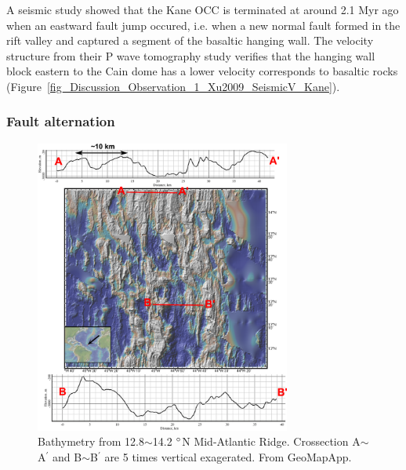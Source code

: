 A seismic study \citep{Xu2009} showed that the Kane OCC is terminated at around 2.1 Myr ago when an eastward fault jump occured, i.e. when a new normal fault formed in the rift valley and captured a segment of the basaltic hanging wall. The velocity structure from their P wave tomography study verifies that the hanging wall block eastern to the Cain dome has a lower velocity corresponds to basaltic rocks (Figure~\hyperref[fig_Discussion_Observation_1_Xu2009_SeismicV_Kane]{\ref{fig_Discussion_Observation_1_Xu2009_SeismicV_Kane}}).

\subsubsection{Fault alternation}

\begin{figure}[h]
 \centering
  \includegraphics[width=0.75\textwidth]{./Figures/fig_Discussion_Observation_2_13-14N_MAR.eps}
 \caption[Bathymetry from 12.8$\sim$14.2 $\degree$N Mid-Atlantic Ridge.]{Bathymetry from 12.8$\sim$14.2 $\degree$N Mid-Atlantic Ridge. Crossection A$\sim$A$^{\prime}$ and B$\sim$B$^{\prime}$ are 5 times vertical exagerated. From GeoMapApp.}
 \label{fig_Discussion_Observation_2_13-14N_MAR}
\end{figure}

